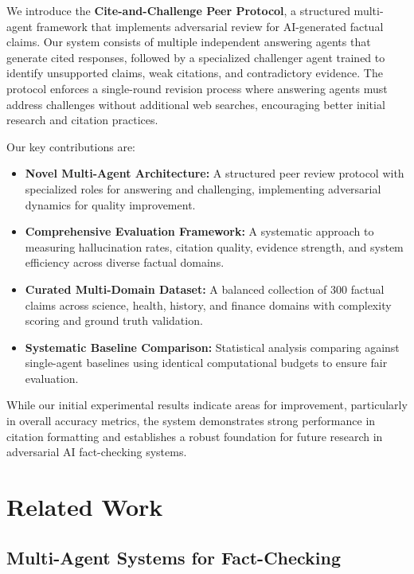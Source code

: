 \documentclass{article}
\begin{document}
We introduce the \textbf{Cite-and-Challenge Peer Protocol}, a structured multi-agent framework that implements adversarial review for AI-generated factual claims. Our system consists of multiple independent answering agents that generate cited responses, followed by a specialized challenger agent trained to identify unsupported claims, weak citations, and contradictory evidence. The protocol enforces a single-round revision process where answering agents must address challenges without additional web searches, encouraging better initial research and citation practices.

Our key contributions are:

\begin{itemize}
    \item \textbf{Novel Multi-Agent Architecture:} A structured peer review protocol with specialized roles for answering and challenging, implementing adversarial dynamics for quality improvement.
    
    \item \textbf{Comprehensive Evaluation Framework:} A systematic approach to measuring hallucination rates, citation quality, evidence strength, and system efficiency across diverse factual domains.
    
    \item \textbf{Curated Multi-Domain Dataset:} A balanced collection of 300 factual claims across science, health, history, and finance domains with complexity scoring and ground truth validation.
    
    \item \textbf{Systematic Baseline Comparison:} Statistical analysis comparing against single-agent baselines using identical computational budgets to ensure fair evaluation.
\end{itemize}

While our initial experimental results indicate areas for improvement, particularly in overall accuracy metrics, the system demonstrates strong performance in citation formatting and establishes a robust foundation for future research in adversarial AI fact-checking systems.

\section{Related Work}

\subsection{Multi-Agent Systems for Fact-Checking}
\end{document}
